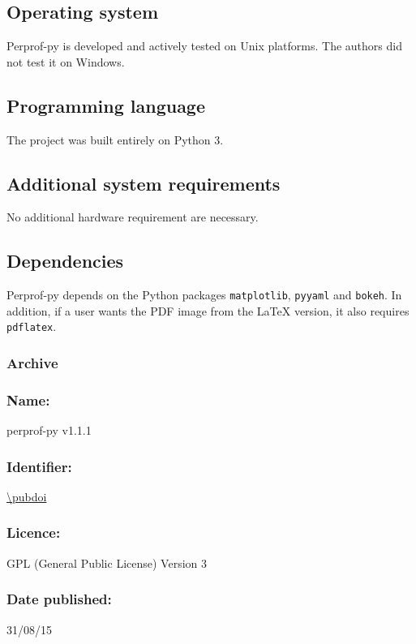 \subsection*{Operating system}

    Perprof-py is developed and actively tested on Unix platforms.
    The authors did not test it on Windows.

\subsection*{Programming language}

    The project was built entirely on Python 3.

\subsection*{Additional system requirements}

    No additional hardware requirement are necessary.

\subsection*{Dependencies}

    Perprof-py depends on the Python packages \texttt{matplotlib}, \texttt{pyyaml} and \texttt{bokeh}.
    In addition, if a user wants the PDF image from the LaTeX
    version, it also requires \texttt{pdflatex}.

\subsubsection*{Archive}

    \subsubsection*{Name:} perprof-py v1.1.1

    \subsubsection*{Identifier:} \url{\pubdoi}

    \subsubsection*{Licence:} GPL (General Public License) Version 3

    \subsubsection*{Date published:} 31/08/15

